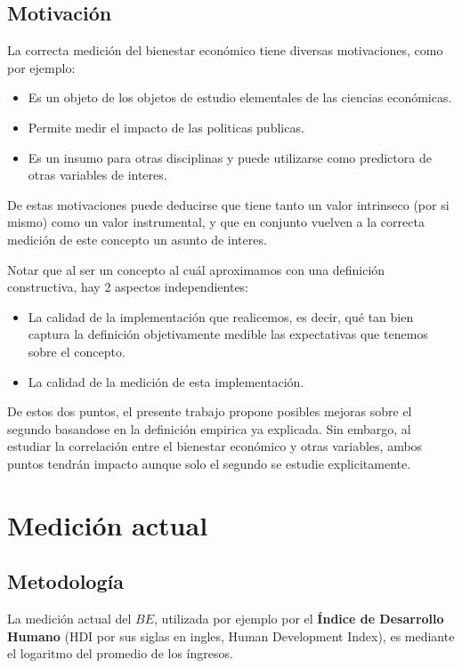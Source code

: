 \subsection{Motivación}

La correcta medición del bienestar económico tiene diversas motivaciones, como por ejemplo:

\begin{itemize}
    \item Es un objeto de los objetos de estudio elementales de las ciencias económicas.
    \item Permite medir el impacto de las politicas publicas.
    \item Es un insumo para otras disciplinas y puede utilizarse como predictora de otras variables de interes.
\end{itemize}

De estas motivaciones puede deducirse que tiene tanto un valor intrinseco (por si mismo) como un valor instrumental, y que en conjunto vuelven a la correcta medición de este concepto un asunto de interes.

Notar que al ser un concepto al cuál aproximamos con una definición constructiva, hay 2 aspectos independientes:

\begin{itemize}
    \item La calidad de la implementación que realicemos, es decir, qué tan bien captura la definición objetivamente medible las expectativas que tenemos sobre el concepto.
    \item La calidad de la medición de esta implementación.
\end{itemize}

De estos dos puntos, el presente trabajo propone posibles mejoras sobre el segundo basandose en la definición empirica ya explicada. Sin embargo, al estudiar la correlación entre el bienestar económico y otras variables, ambos puntos tendrán impacto aunque solo el segundo se estudie explicitamente.

\section{Medición actual}

\subsection{Metodología}

La medición actual del $BE$, utilizada por ejemplo por el \textbf{Índice de Desarrollo Humano} \cite{undp2023tech_notes} (HDI por sus siglas en ingles, Human Development Index), es mediante el logaritmo del promedio de los íngresos.

